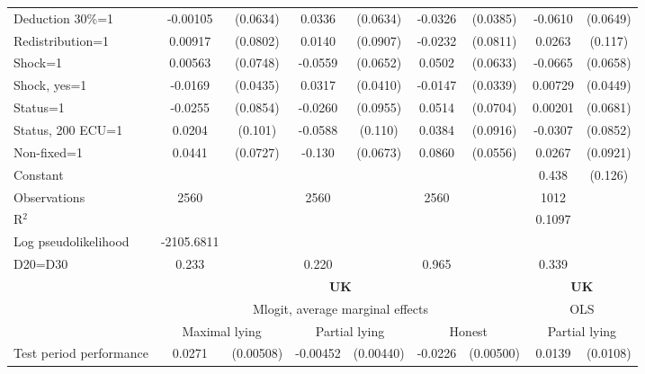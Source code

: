 \begin{tabular}{l|cccccc|cc}
Deduction 30\%=1& -0.00105         & (0.0634)&   0.0336         & (0.0634)&  -0.0326         & (0.0385)&  -0.0610         & (0.0649)\\
Redistribution=1&  0.00917         & (0.0802)&   0.0140         & (0.0907)&  -0.0232         & (0.0811)&   0.0263         &  (0.117)\\
Shock=1         &  0.00563         & (0.0748)&  -0.0559         & (0.0652)&   0.0502         & (0.0633)&  -0.0665         & (0.0658)\\
Shock, yes=1    &  -0.0169         & (0.0435)&   0.0317         & (0.0410)&  -0.0147         & (0.0339)&  0.00729         & (0.0449)\\
Status=1        &  -0.0255         & (0.0854)&  -0.0260         & (0.0955)&   0.0514         & (0.0704)&  0.00201         & (0.0681)\\
Status, 200 ECU=1&   0.0204         &  (0.101)&  -0.0588         &  (0.110)&   0.0384         & (0.0916)&  -0.0307         & (0.0852)\\
Non-fixed=1     &   0.0441         & (0.0727)&   -0.130\sym{*}  & (0.0673)&   0.0860         & (0.0556)&   0.0267         & (0.0921)\\
Constant        &                  &         &                  &         &                  &         &    0.438\sym{***}&  (0.126)\\
\hline
Observations    &     2560         &         &     2560         &         &     2560         &         &     1012         &         \\
R$^2$      &                  &         &                  &         &                  &         &      0.1097     &   \\ 
Log pseudolikelihood  & -2105.6811   &         &                  &         &                  &         &           &   \\ 
D20=D30         &    0.233         &         &    0.220         &         &    0.965         &         &    0.339         &         \\
\hline\hline
&\multicolumn{6}{c|}{\bf UK}&\multicolumn{2}{c}{\bf UK}\\ &\multicolumn{6}{c|}{Mlogit, average marginal effects }&\multicolumn{2}{c}{OLS}\\
                &\multicolumn{2}{c}{Maximal lying}&\multicolumn{2}{c}{Partial lying}&\multicolumn{2}{c}{Honest}  &\multicolumn{2}{c}{Partial lying}\\
\hline
Test period performance&   0.0271\sym{***}&(0.00508)& -0.00452         &(0.00440)&  -0.0226\sym{***}&(0.00500)&   0.0139         & (0.0108)\\

\end{tabular}

